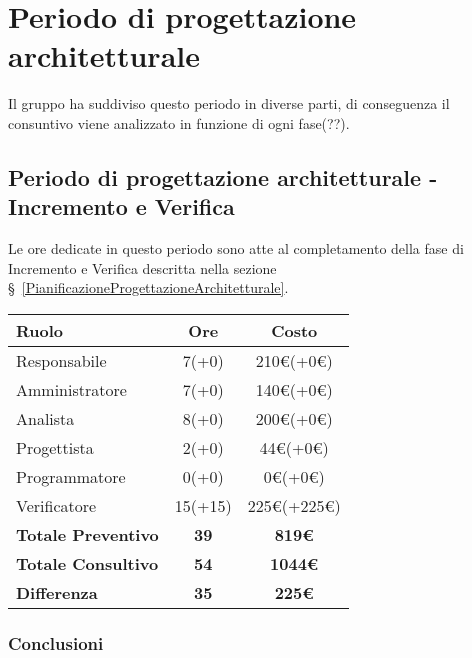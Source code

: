{{\section{Periodo di progettazione architetturale}\label{ConsuntivoPeriodoDiProgettazioneArchitetturale}

Il gruppo ha suddiviso questo periodo in diverse parti, di conseguenza il consuntivo viene analizzato in funzione di ogni fase(??).

\subsection{Periodo di progettazione architetturale - Incremento e Verifica}\label{ConsuntivoPeriodoDiProgettazioneArchitetturaleIncrementoEVerifica}

Le ore dedicate in questo periodo sono atte al completamento della fase di Incremento e Verifica descritta nella sezione \S~\ref{PianificazioneProgettazioneArchitetturale}.

\quad
\def\tabularxcolumn#1{m{#1}}
{
	\begin{center}
		\renewcommand{\arraystretch}{1.4}
		\begin{tabularx}{10cm}{|X|c|c|}
			\hline
			\rowcolor{airforceblue}
			\textbf{Ruolo} & \textbf{Ore} & \textbf{Costo}\\
			\hline
			Responsabile & 7(+0) & 210\euro(+0\euro)\\
			\hline
			Amministratore & 7(+0) & 140\euro(+0\euro)\\
			\hline
			Analista & 8(+0) & 200\euro(+0\euro)\\
			\hline
			Progettista & 2(+0) & 44\euro(+0\euro)\\
			\hline
			Programmatore & 0(+0) & 0\euro(+0\euro)\\
			\hline
			Verificatore & 15(+15) & 225\euro(+225\euro)\\
			\hline
			\textbf{Totale Preventivo} & \textbf{39} & \textbf{819\euro}\\
			\hline
			\textbf{Totale Consultivo} & \textbf{54} & \textbf{1044\euro}\\
			\hline
			\textbf{Differenza} & \textbf{35} & \textbf{225\euro}
		\end{tabularx}
	\end{center}

\subsubsection{Conclusioni}

}}}
